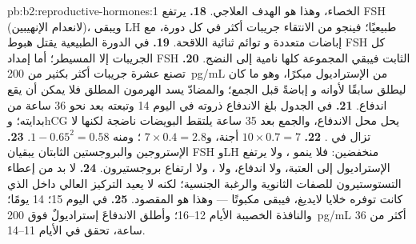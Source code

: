 \begin{solution}{pb:b2:reproductive-hormones:1}
الخصاء، وهذا هو الهدف العلاجي.
\textbf{18.} يرتفع FSH (لانعدام الإنهيبين)، ويبقى LH طبيعيًا؛ فينجو
من الانتقاء جريبات أكثر في كل دورة، مع إباضات متعددة و
توائم ثنائية اللاقحة.
\textbf{19.} في الدورة الطبيعية يقتل هبوط FSH كل الجريبات إلا
المسيطر؛ أما إمداد FSH الثابت فيبقي المجموعة كلها
نامية إلى النضج.
\textbf{20.} تصنع عشرة جريبات أكثر بكثير من \qty{200}{pg/mL} من
الإستراديول مبكرًا، وهو ما كان ليطلق  سابقًا لأوانه و
إباضةً قبل الجمع؛ والمضادّ يسد الهرمون المطلق فلا يمكن
أن يقع اندفاع.
\textbf{21.} في الجدول بلغ الاندفاع ذروته في اليوم 14 وتبعته 
بعد نحو 36 ساعة من بدايته؛ وhCG يحل محل
الاندفاع، والجمع بعد 35 ساعة يلتقط البويضات ناضجة لكنها
لا تزال في .
\textbf{22.} $10\times 0.7 = 7$ أجنة، و$7\times 0.4 = 2.8$
؛ ومنه $1 - 0.65^{2} = 0.58$.
\textbf{23.} الإستروجين والبروجستين الثابتان يبقيان FSH وLH منخفضين: فلا
ينمو ، ولا يرتفع الإستراديول إلى العتبة، ولا اندفاع،
ولا ، ولا ارتفاع بروجستيرون.
\textbf{24.} لا بد من إعطاء التستوستيرون للصفات الثانوية
والرغبة الجنسية؛ لكنه لا يعيد التركيز العالي داخل 
الذي كانت توفره خلايا لايديغ، فيبقى 
مكبوتًا --- وهذا هو المقصود.
\textbf{25.}  في اليوم 15؛  14 يومًا؛ والنافذة
الخصيبة الأيام 12--16؛ وأطلق الاندفاعَ إستراديولٌ فوق
\qty{200}{pg/mL} أكثر من 36 ساعة، تحقق في الأيام 11--14.
\end{solution}
